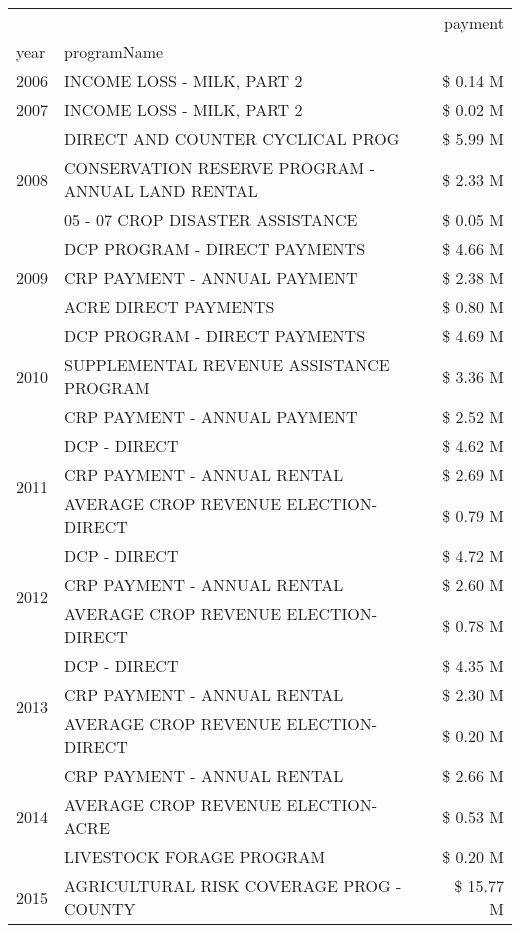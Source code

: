 \begin{tabular}{llr}
\toprule
 &  & payment \\
year & programName &  \\
\midrule
2006 & INCOME LOSS - MILK, PART 2 & \$ 0.14 M \\
\cline{1-3}
2007 & INCOME LOSS - MILK, PART 2 & \$ 0.02 M \\
\cline{1-3}
\multirow[t]{3}{*}{2008} & DIRECT AND COUNTER CYCLICAL PROG & \$ 5.99 M \\
 & CONSERVATION RESERVE PROGRAM - ANNUAL LAND RENTAL & \$ 2.33 M \\
 & 05 - 07 CROP DISASTER ASSISTANCE & \$ 0.05 M \\
\cline{1-3}
\multirow[t]{3}{*}{2009} & DCP PROGRAM - DIRECT PAYMENTS & \$ 4.66 M \\
 & CRP PAYMENT - ANNUAL PAYMENT & \$ 2.38 M \\
 & ACRE DIRECT PAYMENTS & \$ 0.80 M \\
\cline{1-3}
\multirow[t]{3}{*}{2010} & DCP PROGRAM - DIRECT PAYMENTS & \$ 4.69 M \\
 & SUPPLEMENTAL REVENUE ASSISTANCE PROGRAM & \$ 3.36 M \\
 & CRP PAYMENT - ANNUAL PAYMENT & \$ 2.52 M \\
\cline{1-3}
\multirow[t]{3}{*}{2011} & DCP - DIRECT & \$ 4.62 M \\
 & CRP PAYMENT - ANNUAL RENTAL & \$ 2.69 M \\
 & AVERAGE CROP REVENUE ELECTION-DIRECT & \$ 0.79 M \\
\cline{1-3}
\multirow[t]{3}{*}{2012} & DCP - DIRECT & \$ 4.72 M \\
 & CRP PAYMENT - ANNUAL RENTAL & \$ 2.60 M \\
 & AVERAGE CROP REVENUE ELECTION-DIRECT & \$ 0.78 M \\
\cline{1-3}
\multirow[t]{3}{*}{2013} & DCP - DIRECT & \$ 4.35 M \\
 & CRP PAYMENT - ANNUAL RENTAL & \$ 2.30 M \\
 & AVERAGE CROP REVENUE ELECTION-DIRECT & \$ 0.20 M \\
\cline{1-3}
\multirow[t]{3}{*}{2014} & CRP PAYMENT - ANNUAL RENTAL & \$ 2.66 M \\
 & AVERAGE CROP REVENUE ELECTION-ACRE & \$ 0.53 M \\
 & LIVESTOCK FORAGE PROGRAM & \$ 0.20 M \\
\cline{1-3}
\multirow[t]{3}{*}{2015} & AGRICULTURAL RISK COVERAGE PROG - COUNTY & \$ 15.77 M \\

\end{tabular}
